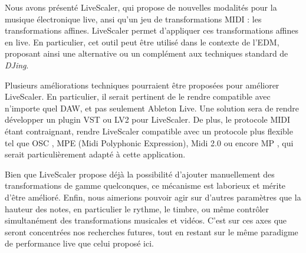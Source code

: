 Nous avons présenté LiveScaler, qui propose de nouvelles modalités pour la musique électronique live, ansi qu'un jeu de transformations MIDI : les transformations affines.  Live\-Scaler permet d'appliquer ces transformations affines en live. En particulier, cet outil peut être utilisé dans le contexte de l'EDM, proposant ainsi une alternative ou un complément aux techniques standard de \emph{DJing}.

Plusieurs améliorations techniques pourraient être proposées pour améliorer LiveScaler. En particulier, il serait pertinent de le rendre compatible avec n'importe quel DAW, et pas seulement Ableton Live. Une solution sera de rendre développer un plugin VST ou LV2 pour LiveScaler. De plus, le protocole MIDI étant contraignant, rendre LiveScaler compatible avec un protocole plus flexible tel que OSC \cite{wright2005open}, MPE (Midi Polyphonic Expression), Midi 2.0 ou encore  MP \cite{goudard2017mapping}, qui serait particulièrement adapté à cette application.

Bien que LiveScaler propose déjà la possibilité d'ajouter manuellement des transformations de gamme quelconques, ce mécanisme est laborieux et mérite d'être amélioré. Enfin, nous aimerions pouvoir agir sur d'autres paramètres que la hauteur des notes, en particulier le rythme, le timbre, ou même contrôler simultanément des transformations musicales et vidéos. C'est sur ces axes que seront concentrées nos recherches futures, tout en restant sur le même paradigme de performance live que celui proposé ici.
